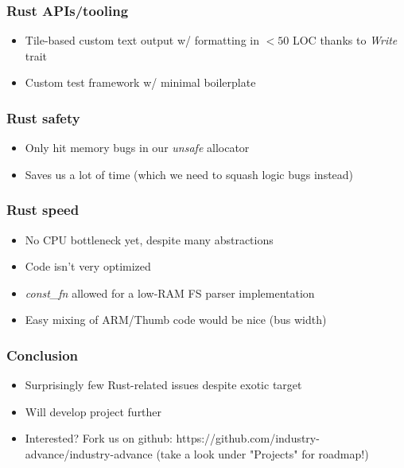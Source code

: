 \documentclass{beamer}
\begin{document}
\begin{frame}
	\frametitle{Rust APIs/tooling}
	\begin{itemize}
		\item Tile-based custom text output w/ formatting in $<50$ LOC thanks to \emph{Write} trait
		\item Custom test framework w/ minimal boilerplate
	\end{itemize}
\end{frame}

\begin{frame}
	\frametitle{Rust safety}
	\begin{itemize}
		\item Only hit memory bugs in our \emph{unsafe} allocator
		\item Saves us a lot of time (which we need to squash logic bugs instead)
	\end{itemize}
\end{frame}

\begin{frame}
	\frametitle{Rust speed}
	\begin{itemize}
		\item No CPU bottleneck yet, despite many abstractions
		\item Code isn't very optimized
		\item \emph{const\_fn} allowed for a low-RAM FS parser implementation
		\item Easy mixing of ARM/Thumb code would be nice (bus width)
	\end{itemize}
\end{frame}

\begin{frame}
	\frametitle{Conclusion}
	\begin{itemize}
		\item Surprisingly few Rust-related issues despite exotic target
		\item Will develop project further
		\item Interested? Fork us on github: https://github.com/industry-advance/industry-advance (take a look under "Projects" for roadmap!)
	\end{itemize}
\end{frame}
\end{document}
